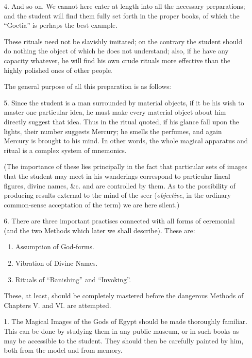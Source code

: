 4. And so on. We cannot here enter at length into all the necessary preparations; and the student will find them fully set forth in the proper books, of which the \enquote{Goetia} is perhaps the best example.

These rituals need not be slavishly imitated; on the contrary the student should do nothing the object of which he does not understand; also, if he have any capacity whatever, he will find his own crude rituals more effective than the highly polished ones of other people.


The general purpose of all this preparation is as follows:


5. Since the student is a man surrounded by material objects, if it be his wish to master one particular idea, he must make every material object about him directly suggest that idea. Thus in the ritual quoted, if his glance fall upon the lights, their number suggests Mercury; he smells the perfumes, and again Mercury is brought to his mind. In other words, the whole magical apparatus and ritual is a complex system of mnemonics.

(The importance of these lies principally in the fact that particular sets of images that the student may meet in his wanderings correspond to particular lineal figures, divine names, \&c. and are controlled by them. As to the possibility of producing results external to the mind of the seer (\textit{objective}, in the ordinary common-sense acceptation of the term) we are here silent.)

6. There are three important practises connected with all forms of ceremonial (and the two Methods which later we shall describe). These are:

\begin{enumerate}[label=(\arabic*)]
\item Assumption of God-forms.
\item Vibration of Divine Names.
\item Rituals of \enquote{Banishing} and \enquote{Invoking}.
\end{enumerate}

These, at least, should be completely mastered before the dangerous Methods of Chapters V. and VI. are attempted.




1. The Magical Images of the Gods of Egypt should be made thoroughly familiar. This can be done by studying them in any public museum, or in such books as may be accessible to the student. They should then be carefully painted by him, both from the model and from memory.


